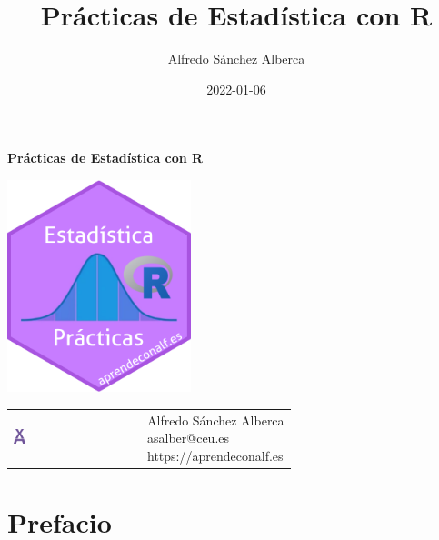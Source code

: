 \documentclass[
  a4paper,
]{scrreport}
\title{Prácticas de Estadística con R}
\author{Alfredo Sánchez Alberca}
\date{2022-01-06}
\renewcommand*\contentsname{Tabla de contenidos}
\newcommand\contentsname{Tabla de contenidos}
\theoremstyle{definition}
\theoremstyle{remark}
\begin{document}
\begin{titlepage}

\begin{center}
\vspace*{5cm}

\Huge
{\textbf{\textsf{Prácticas de Estadística con R}}}

\vspace{0.5cm}
\LARGE
{\textbf{\textsf{}}}

\vspace{1.5cm}

\includegraphics[width=0.4\textwidth]{img/logos/sticker-estadistica-r.png}
\end{center}

\vfill

\begin{flushleft}
\begin{tabular}{ll}
\includegraphics[width=0.1\textwidth]{img/logos/aprendeconalf.png} & \parbox[b]{5cm}{\Large\textsf{Alfredo
Sánchez
Alberca}\\ \textsf{asalber@ceu.es} \\ \textsf{https://aprendeconalf.es}}
\end{tabular}
\end{flushleft}
\end{titlepage}
\renewcommand*\contentsname{Tabla de contenidos}
{
\hypersetup{linkcolor=}
\setcounter{tocdepth}{2}
\tableofcontents
}

\chapter*{Prefacio}\label{prefacio}
\end{document}
